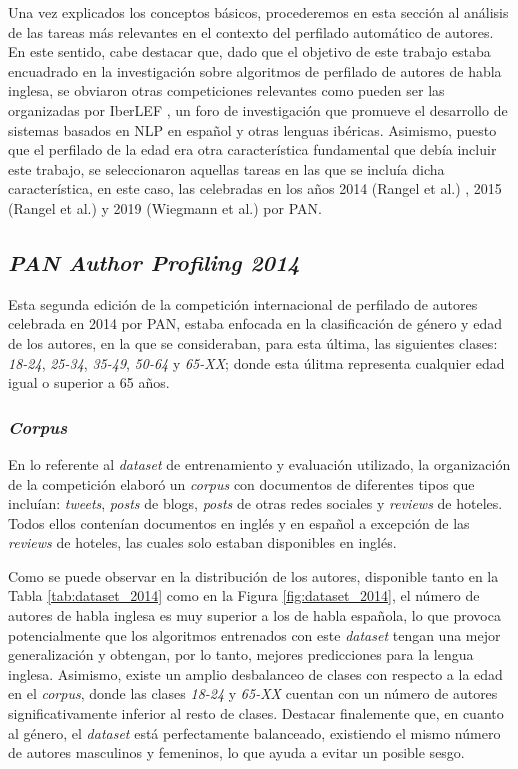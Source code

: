 Una vez explicados los conceptos básicos, procederemos en esta sección al análisis de las tareas más relevantes en el contexto
del perfilado automático de autores. En este sentido, cabe destacar que, dado que el objetivo de este trabajo estaba encuadrado en
la investigación sobre algoritmos de perfilado de autores de habla inglesa, se obviaron otras competiciones relevantes como pueden ser
las organizadas por IberLEF \cite{iberlef}, un foro de investigación que promueve el desarrollo de sistemas basados en NLP en español y otras
lenguas ibéricas.
Asimismo, puesto que el perfilado de la edad era otra característica fundamental que debía incluir este trabajo, se seleccionaron aquellas tareas
en las que se incluía dicha característica, en este caso, las celebradas en los años 2014 (Rangel et al.) \cite{rangel2014overview}, 2015 (Rangel et al.) \cite{rangel2015overview} y 2019 (Wiegmann et al.) \cite{wiegmann2019overview}
por PAN.

\subsection{\textit{PAN Author Profiling 2014}}

Esta segunda edición de la competición internacional de perfilado de autores celebrada en 2014 por PAN, estaba enfocada en la clasificación de género y edad de los autores, en la que se consideraban, para esta última, las siguientes
clases: \textit{18-24}, \textit{25-34}, \textit{35-49}, \textit{50-64} y \textit{65-XX}; donde esta úlitma representa cualquier edad igual o superior a 65 años.

\subsubsection{\textit{Corpus}}

En lo referente al \textit{dataset} de entrenamiento y evaluación utilizado, la organización de la
competición elaboró un \textit{corpus} con documentos de diferentes tipos que incluían: \textit{tweets}, \textit{posts} de blogs, \textit{posts} de otras redes sociales y \textit{reviews} de hoteles.
Todos ellos contenían documentos en inglés y en español a excepción de las \textit{reviews} de hoteles, las cuales solo estaban disponibles en inglés.

\bigskip
Como se puede observar en la distribución de los autores, disponible tanto en la Tabla \ref{tab:dataset_2014} como en la Figura \ref{fig:dataset_2014}, el número de autores de habla inglesa
es muy superior a los de habla española, lo que provoca potencialmente que los algoritmos entrenados con este \textit{dataset} tengan una mejor generalización y obtengan, por lo tanto,
mejores predicciones para la lengua inglesa. Asimismo, existe un amplio desbalanceo de clases con respecto a la edad en el \textit{corpus},
donde las clases \textit{18-24} y \textit{65-XX} cuentan con un número de autores significativamente inferior al resto de clases. Destacar finalemente que,
en cuanto al género, el \textit{dataset} está perfectamente balanceado, existiendo el mismo número de autores masculinos y femeninos, lo que
ayuda a evitar un posible sesgo.

